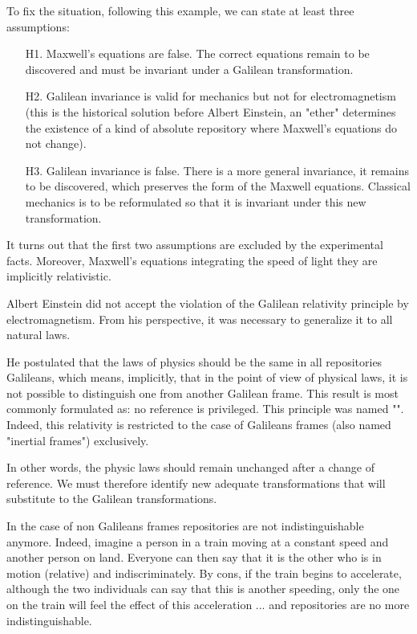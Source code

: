 	To fix the situation, following this example, we can state at least three assumptions:
	\begin{enumerate}
		\item[H1.] Maxwell's equations are false. The correct equations remain to be discovered and must be invariant under a Galilean transformation.
		\item[H2.] Galilean invariance is valid for mechanics but not for electromagnetism (this is the historical solution before Albert Einstein, an "ether" determines the existence of a kind of absolute repository where Maxwell's equations do not change).
		\item[H3.] Galilean invariance is false. There is a more general invariance, it remains to be discovered, which preserves the form of the Maxwell equations. Classical mechanics is to be reformulated so that it is invariant under this new transformation.
	\end{enumerate}
	\begin{tcolorbox}[title=Remark,colframe=black,arc=10pt]
	It turns out that the first two assumptions are excluded by the experimental facts. Moreover, Maxwell's equations integrating the speed of light they are implicitly relativistic.
	\end{tcolorbox}	
	Albert Einstein did not accept the violation of the Galilean relativity principle by electromagnetism. From his perspective, it was necessary to generalize it to all natural laws.
	
	He postulated that the laws of physics should be the same in all repositories Galileans, which means, implicitly, that in the point of view of physical laws, it is not possible to distinguish one from another Galilean frame. This result is most commonly formulated as: no reference is privileged. This principle was named "". Indeed, this relativity is restricted to the case of Galileans frames (also named "inertial frames") exclusively.
	
	In other words, the physic laws should remain unchanged after a change of reference. We must therefore identify new adequate transformations that will substitute to the Galilean transformations.
	
	In the case of non Galileans frames repositories are not indistinguishable anymore. Indeed, imagine a person in a train moving at a constant speed and another person on land. Everyone can then say that it is the other who is in motion (relative) and indiscriminately. By cons, if the train begins to accelerate, although the two individuals can say that this is another speeding, only the one on the train will feel the effect of this acceleration ... and repositories are no more indistinguishable.
	
